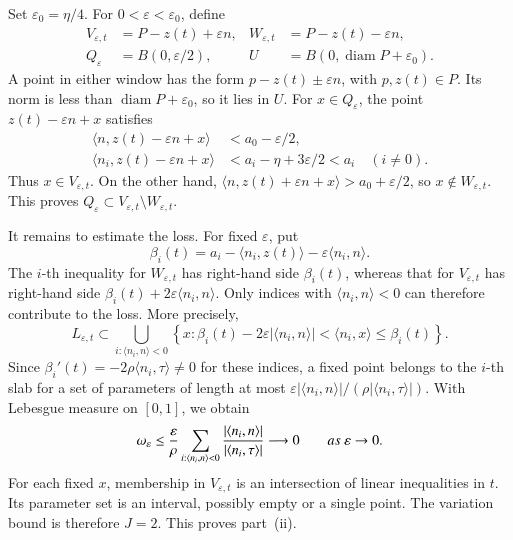 \documentclass[10pt,a4paper]{amsart}
\newcommand\inpro[2]{\langle #1,#2\rangle}
\newcommand\1{\mathbbm{1}}
\newcommand{\eps}{\varepsilon}
\begin{document}
Set $\eps_0=\eta/4$. For $0<\eps<\eps_0$, define
\begin{equation}\label{eq:geom-polytope-windows}
    \begin{aligned}
        V_{\eps,t}&=P-z(t)+\eps n,
        &W_{\eps,t}&=P-z(t)-\eps n,\\
        Q_\eps&=B(0,\eps/2),
        &U&=B(0,\operatorname{diam}P+\eps_0).
    \end{aligned}
\end{equation}
A point in either window has the form $p-z(t)\pm\eps n$, with $p,z(t)\in P$.
Its norm is less than $\operatorname{diam}P+\eps_0$, so it lies in $U$. For $x\in Q_\eps$, the point $z(t)-\eps n+x$ satisfies
\begin{equation*}
    \begin{aligned}
        \inpro{n}{z(t)-\eps n+x}&<a_0-\eps/2,\\
        \inpro{n_i}{z(t)-\eps n+x}
        &<a_i-\eta+3\eps/2<a_i\quad(i\ne0).
    \end{aligned}
\end{equation*}
Thus $x\in V_{\eps,t}$. On the other hand,
$\inpro{n}{z(t)+\eps n+x}>a_0+\eps/2$, so $x\notin W_{\eps,t}$.
This proves $Q_\eps\subset V_{\eps,t}\setminus W_{\eps,t}$.

It remains to estimate the loss. For fixed $\eps$, put
\begin{equation*}
    \beta_i(t)=a_i-\inpro{n_i}{z(t)}-\eps\inpro{n_i}{n}.
\end{equation*}
The $i$-th inequality for $W_{\eps,t}$ has right-hand side $\beta_i(t)$,
whereas that for $V_{\eps,t}$ has right-hand side
$\beta_i(t)+2\eps\inpro{n_i}{n}$.
Only indices with $\inpro{n_i}{n}<0$ can therefore contribute to the loss.
More precisely,
\begin{equation}\label{eq:geom-polytope-slabs}
    L_{\eps,t}\subset
    \bigcup_{i:\inpro{n_i}{n}<0}
    \left\{x:
       \beta_i(t)-2\eps|\inpro{n_i}{n}|
       <\inpro{n_i}{x}\le\beta_i(t)\right\}.
\end{equation}
Since $\beta_i'(t)=-2\rho\inpro{n_i}{\tau}\ne0$ for these indices,
a fixed point belongs to the $i$-th slab for a set of parameters of length
at most $\eps|\inpro{n_i}{n}|/(\rho|\inpro{n_i}{\tau}|)$.
With Lebesgue measure on $[0,1]$, we obtain
\begin{equation}\label{eq:geom-polytope-overlap}
    \omega_\eps
    \le\frac\eps\rho
       \sum_{i:\inpro{n_i}{n}<0}
       \frac{|\inpro{n_i}{n}|}{|\inpro{n_i}{\tau}|}
    \longrightarrow0\qquad{\rm{as}}\ \eps\to0.
\end{equation}
For each fixed $x$, membership in $V_{\eps,t}$ is an intersection of
linear inequalities in $t$. Its parameter set is an interval, possibly empty
or a single point. The variation bound is therefore $J=2$.
This proves part~(ii).
\end{document}
